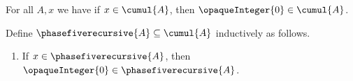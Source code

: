 \begin{axiom}\label{phase5_recursive_guard}
    For all $A, x$ we have if $x \in \cumul{A}$, then $\opaqueInteger{0} \in \cumul{A}$.
\end{axiom}

\begin{inductive}\label{phase5_recursive}
    Define $\phasefiverecursive{A}\subseteq\cumul{A}$ inductively as follows.
    \begin{enumerate}
        \item If $x\in\phasefiverecursive{A}$, then $\opaqueInteger{0}\in\phasefiverecursive{A}$.
    \end{enumerate}
\end{inductive}
